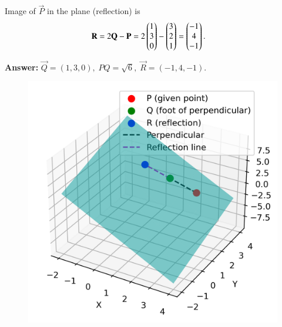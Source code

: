 \documentclass[journal]{IEEEtran}
\begin{document}
Image of $\vec{P}$ in the plane (reflection) is
\begin{align}
\mathbf{R} &= 2\mathbf{Q} - \mathbf{P} = 2\begin{pmatrix}1\\3\\0\end{pmatrix} - \begin{pmatrix}3\\2\\1\end{pmatrix} = \begin{pmatrix}-1\\4\\-1\end{pmatrix}.
\end{align}

\bigskip
\noindent\textbf{Answer:} \(
\vec{Q}=(1,3,0),\; PQ=\sqrt{6},\; \vec{R}=(-1,4,-1).
\)
\begin{figure}[h!]
  \centering
   \includegraphics[width=0.7\linewidth]{../figs/point_plane.png}
   \caption{}
  \label{stemplot}
\end{figure}
\end{document}
